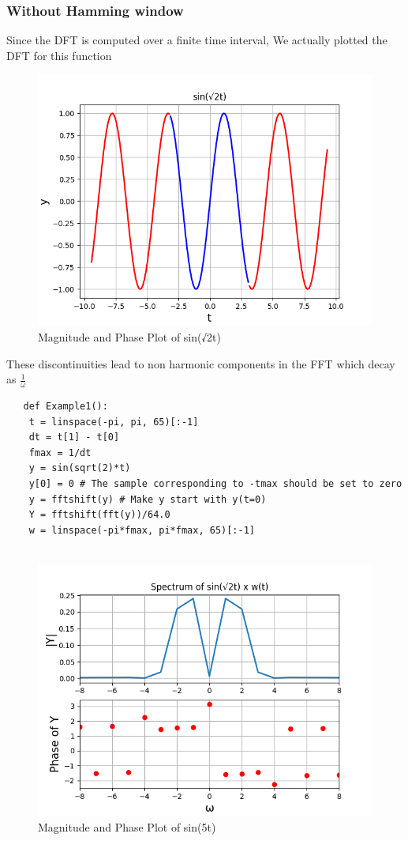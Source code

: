 \documentclass{article}
\begin{document}
\subsubsection{Without Hamming window}
Since the DFT is computed over a finite time interval, We actually plotted the DFT for this function
\newpage
\begin{figure}[!ht]
  \centering
  \includegraphics[scale=0.6]{Figure_2.png}
  \caption{Magnitude and Phase Plot of sin(√2t)}
  \label{fig:sample}
  \end{figure}
These discontinuities lead to  non harmonic components in the FFT which decay as \(\frac{1}{\omega}\)

\begin{verbatim}
   def Example1():
    t = linspace(-pi, pi, 65)[:-1]
    dt = t[1] - t[0] 
    fmax = 1/dt
    y = sin(sqrt(2)*t)
    y[0] = 0 # The sample corresponding to -tmax should be set to zero
    y = fftshift(y) # Make y start with y(t=0)
    Y = fftshift(fft(y))/64.0
    w = linspace(-pi*fmax, pi*fmax, 65)[:-1]
    
\end{verbatim}
\begin{figure}[!ht]
  \centering
  \includegraphics[scale=0.6]{Figure_5.png}
  \caption{Magnitude and Phase Plot of sin(5t)}
  \label{fig:sample}
  \end{figure}
\end{document}
